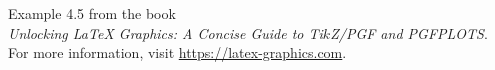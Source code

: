 \documentclass{article}
\begin{document}
Example 4.5 from the book\\
\emph{Unlocking LaTeX Graphics: A Concise Guide to Ti$k$Z/PGF and PGFPLOTS}.\\
For more information, visit \url{https://latex-graphics.com}.
\par\bigskip

\end{document}
